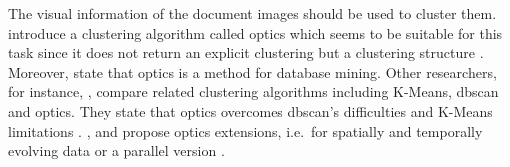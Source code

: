 The visual information of the document images should be used to cluster them.
\citeauthor{OPTICS1999} introduce a clustering algorithm called \ac{optics} which seems to be suitable for this task 
since it does not return an explicit clustering but a clustering structure \cite{OPTICS1999}.
Moreover, \citeauthor{OPTICS1999} state that \ac{optics} is a method for database mining.
Other researchers, for instance, \citeauthor{OPTICS_kMeans_2016}, compare related clustering algorithms including K-Means, \ac{dbscan} and \ac{optics}.
They state that \ac{optics} overcomes \ac{dbscan}'s difficulties and K-Means limitations \cite{OPTICS_kMeans_2016}.
\citeauthor{OPTICS2013}, \citeauthor{OPTICS2014} and \citeauthor{OPTICS2016} propose \ac{optics} extensions, 
i.e.\ for spatially and temporally evolving data or a parallel version \cite{OPTICS2013, OPTICS2014, OPTICS2016}.

